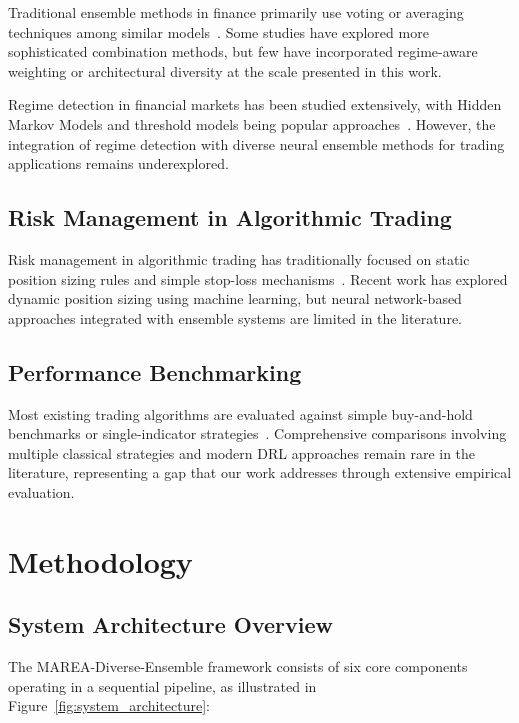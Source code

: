 \documentclass[10pt,twocolumn]{article}
\begin{document}
Traditional ensemble methods in finance primarily use voting or averaging techniques among similar models~\cite{ensemble_finance}. Some studies have explored more sophisticated combination methods, but few have incorporated regime-aware weighting or architectural diversity at the scale presented in this work.

Regime detection in financial markets has been studied extensively, with Hidden Markov Models and threshold models being popular approaches~\cite{regime_detection}. However, the integration of regime detection with diverse neural ensemble methods for trading applications remains underexplored.

\subsection{Risk Management in Algorithmic Trading}

Risk management in algorithmic trading has traditionally focused on static position sizing rules and simple stop-loss mechanisms~\cite{risk_management}. Recent work has explored dynamic position sizing using machine learning, but neural network-based approaches integrated with ensemble systems are limited in the literature.

\subsection{Performance Benchmarking}

Most existing trading algorithms are evaluated against simple buy-and-hold benchmarks or single-indicator strategies~\cite{trading_benchmarks}. Comprehensive comparisons involving multiple classical strategies and modern DRL approaches remain rare in the literature, representing a gap that our work addresses through extensive empirical evaluation.

\section{Methodology}

\subsection{System Architecture Overview}

The MAREA-Diverse-Ensemble framework consists of six core components operating in a sequential pipeline, as illustrated in Figure~\ref{fig:system_architecture}:
\end{document}
